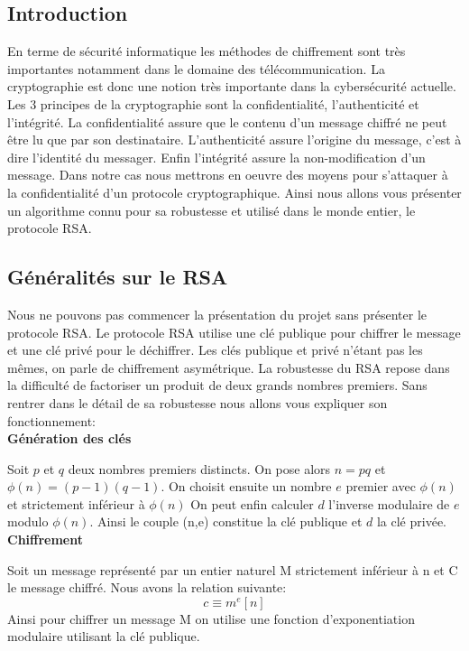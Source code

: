 \subsection{Introduction}
En terme de sécurité informatique les méthodes de chiffrement sont très importantes notamment dans le domaine des télécommunication. La cryptographie est donc une notion très importante dans la cybersécurité actuelle. Les 3 principes de la cryptographie sont la confidentialité, l'authenticité et l'intégrité.
La confidentialité assure que le contenu d'un message chiffré ne peut être lu que par son destinataire.
L'authenticité assure l'origine du message, c'est à dire l'identité du messager.
Enfin l'intégrité assure la non-modification d'un message.
Dans notre cas nous mettrons en oeuvre des moyens pour s'attaquer à la confidentialité d'un protocole cryptographique. 
Ainsi nous allons vous présenter un algorithme connu pour sa robustesse et utilisé dans le monde entier, le protocole RSA.
\newpage
\subsection{Généralités sur le RSA}
Nous ne pouvons pas commencer la présentation du projet sans présenter le protocole RSA.
Le protocole RSA utilise une clé publique pour chiffrer le message et une clé privé pour le déchiffrer. Les clés publique et privé n'étant pas les mêmes, on parle de chiffrement asymétrique.
La robustesse du RSA repose dans la difficulté de factoriser un produit de deux grands nombres premiers.
Sans rentrer dans le détail de sa robustesse nous allons vous expliquer son fonctionnement:
\\

\textbf{Génération des clés}


Soit $p$ et $q$ deux nombres premiers distincts. On pose alors $n=pq$ et $\phi(n)=(p-1)(q-1)$.
On choisit ensuite un nombre $e$ premier avec $\phi(n)$ et strictement inférieur à $\phi(n)$
On peut enfin calculer $d$ l'inverse modulaire de $e$ modulo $\phi(n)$.
Ainsi le couple (n,e) constitue la clé publique et $d$ la clé privée.
\\

\textbf{Chiffrement}


Soit un message représenté par un entier naturel M strictement inférieur à n et C le message chiffré.
Nous avons la relation suivante:
\begin{equation}
\label{eq:chiffrement}
c \equiv m^e [n]
\end{equation}
Ainsi pour chiffrer un message M on utilise une fonction d'exponentiation modulaire utilisant la clé publique.
\\

